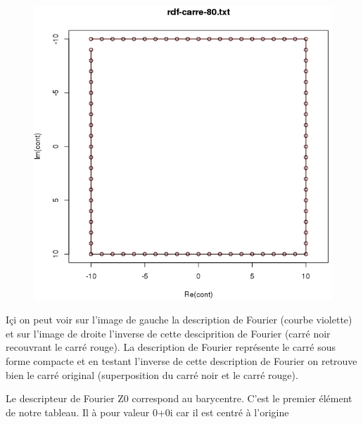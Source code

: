 \documentclass[a4paper,12pt]{report}
\begin{document}
\begin{figure}[!ht]
{		\includegraphics[scale=0.3]{image/fourier2.png}
	}
\end{figure}

Içi on peut voir sur l'image de gauche la description de Fourier (courbe violette) et sur l'image de droite l'inverse de cette desciprition de Fourier (carré noir recouvrant le carré rouge). La description de Fourier représente le carré sous forme compacte et en testant l'inverse de cette description de Fourier on retrouve bien le carré original (superposition du carré noir et le carré rouge).

Le descripteur de Fourier Z0 correspond au barycentre. C'est le premier élément de notre tableau. Il à pour valeur 0+0i car il est centré à l'origine
\end{document}
